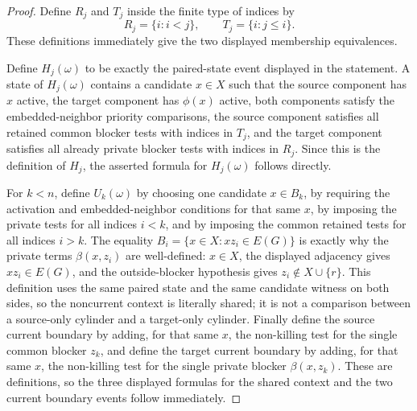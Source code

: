 \begin{proof}
Define \(R_j\) and \(T_j\) inside the finite type of indices by
\[
  R_j=\{i:i<j\},\qquad T_j=\{i:j\le i\}.
\]
These definitions immediately give the two displayed membership
equivalences.

Define \(H_j(\omega)\) to be exactly the paired-state event displayed in the
statement.  A state of \(H_j(\omega)\) contains a candidate \(x\in X\) such
that the source component has \(x\) active, the target component has
\(\phi(x)\) active, both components satisfy the embedded-neighbor priority
comparisons, the source component satisfies all retained common blocker tests
with indices in \(T_j\), and the target component satisfies all already
private blocker tests with indices in \(R_j\).  Since this is the definition
of \(H_j\), the asserted formula for \(H_j(\omega)\) follows directly.

For \(k<n\), define \(U_k(\omega)\) by choosing one candidate
\(x\in B_k\), by requiring the activation and embedded-neighbor conditions for
that same \(x\), by imposing the private tests for all indices \(i<k\), and
by imposing the common retained tests for all indices \(i>k\).  The equality
\(B_i=\{x\in X:xz_i\in E(G)\}\) is exactly why the private terms
\(\beta(x,z_i)\) are well-defined: \(x\in X\), the displayed adjacency gives
\(xz_i\in E(G)\), and the outside-blocker hypothesis gives
\(z_i\notin X\cup\{r\}\).  This definition uses the same paired state and the
same candidate witness on both sides, so the noncurrent context is literally
shared; it is not a comparison between a source-only cylinder and a
target-only cylinder.  Finally define the source current boundary by adding,
for that same \(x\), the non-killing test for the single common blocker
\(z_k\), and define the target current boundary by adding, for that same
\(x\), the non-killing test for the single private blocker
\(\beta(x,z_k)\).  These are definitions, so the three displayed formulas for
the shared context and the two current boundary events follow immediately.
\end{proof}
